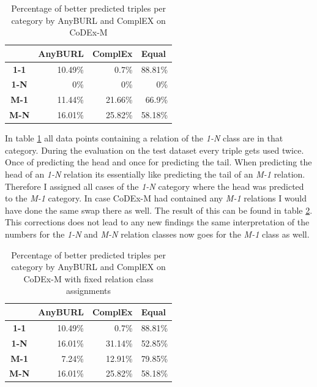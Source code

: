 \begin{table}[H]
\centering
\begin{tabular}{c|rrr}
\multicolumn{1}{l|}{} & \multicolumn{1}{c}{\textbf{AnyBURL}} & \multicolumn{1}{c}{\textbf{ComplEx}} & \multicolumn{1}{l}{\textbf{Equal}} \\ \hline
\textbf{1-1} & 10.49\% & 0.7\% & 88.81\% \\
\textbf{1-N} & 0\% & 0\% & 0\% \\
\textbf{M-1} & 11.44\% & 21.66\% & 66.9\% \\
\textbf{M-N} & 16.01\% & 25.82\% & 58.18\%
\end{tabular}
\caption{Percentage of better predicted triples per category by AnyBURL and ComplEX on CoDEx-M}
\label{tab:relation_class_anyburl_complex_codex}
\end{table}

In table \ref{tab:relation_class_anyburl_complex_codex} all data points containing a relation of the \textit{1-N} class are in that category. During the evaluation on the test dataset every triple gets used twice. Once of predicting the head and once for predicting the tail. When predicting the head of an \textit{1-N} relation its essentially like predicting the tail of an \textit{M-1} relation. Therefore I assigned all cases of the \textit{1-N} category where the head was predicted to the \textit{M-1} category. In case CoDEx-M had contained any \textit{M-1} relations I would have done the same swap there as well. The result of this can be found in table \ref{tab:relation_class_cleaned_anyburl_complex_codex}. This corrections does not lead to any new findings the same interpretation of the numbers for the \textit{1-N} and \textit{M-N} relation classes now goes for the \textit{M-1} class as well.

\begin{table}[H]
\centering
\begin{tabular}{c|rrr}
\multicolumn{1}{l|}{} & \multicolumn{1}{c}{\textbf{AnyBURL}} & \multicolumn{1}{c}{\textbf{ComplEx}} & \multicolumn{1}{l}{\textbf{Equal}} \\ \hline
\textbf{1-1} & 10.49\% & 0.7\% & 88.81\% \\
\textbf{1-N} & 16.01\% & 31.14\% & 52.85\% \\
\textbf{M-1} & 7.24\% & 12.91\% & 79.85\% \\
\textbf{M-N} & 16.01\% & 25.82\% & 58.18\%
\end{tabular}
\caption{Percentage of better predicted triples per category by AnyBURL and ComplEX on CoDEx-M with fixed relation class assignments}
\label{tab:relation_class_cleaned_anyburl_complex_codex}
\end{table}

